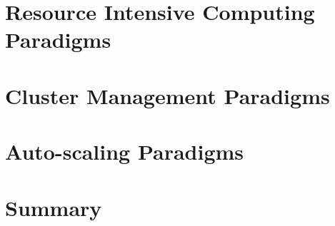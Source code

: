 \section{Resource Intensive Computing Paradigms}



\section{Cluster Management Paradigms}



\section{Auto-scaling Paradigms}



\section{Summary}


